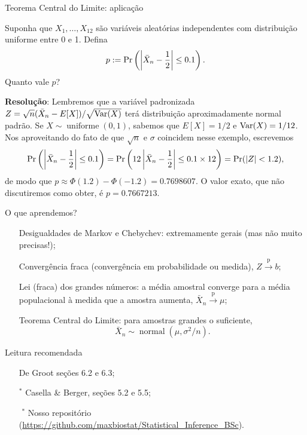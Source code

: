 \begin{frame}{Teorema Central do Limite: aplicação}
\begin{pergunta}
Suponha que $X_1, \ldots, X_{12}$ são variáveis aleatórias independentes com distribuição uniforme entre 0 e 1.
Defina
$$  p:=  \operatorname{Pr}\left(\left| \bar{X}_n - \frac{1}{2}\right| \leq 0.1\right).$$
Quanto vale $p$?
\end{pergunta}
\textbf{Resolução}: 
Lembremos que a variável padronizada $Z = \sqrt{n}(\bar{X}_n-E[X])/\sqrt{\operatorname{Var}(X)}$ terá distribuição aproximadamente normal padrão.
Se $X\sim \operatorname{uniforme}(0, 1)$, sabemos que $E[X] = 1/2$ e $\operatorname{Var}(X) = 1/12$.
Nos aproveitando do fato de que $\sqrt{n}$ e $\sigma$ coincidem nesse exemplo, escrevemos
$$\operatorname{Pr}\left(\left| \bar{X}_n - \frac{1}{2}\right| \leq 0.1\right) =  \operatorname{Pr}\left(12\left| \bar{X}_n - \frac{1}{2}\right| \leq 0.1\times 12\right) = \operatorname{Pr}(|Z| < 1.2),$$
de modo que $p \approx \Phi(1.2)-\Phi(-1.2) = 0.7698607$.
O valor exato, que não discutiremos como obter, é $p = 0.7667213$.
\end{frame}
\begin{frame}{O que aprendemos?}
\begin{itemize}
\item[\faLightbulbO] Desigualdades de Markov e Chebychev: extremamente gerais (mas não muito precisas!);
\item[\faLightbulbO] Convergência fraca (convergência em probabilidade ou medida), $Z \xrightarrow{\text{p}} b$;
\item[\faLightbulbO] Lei (fraca) dos grandes números: a média amostral converge para a média populacional à medida que a amostra aumenta, $\bar{X}_n \xrightarrow{\text{p}} \mu$;
\item[\faLightbulbO] Teorema Central do Limite: para amostras grandes o suficiente, 
$$\bar{X}_n \sim \operatorname{normal}(\mu, \sigma^2/n).$$
\end{itemize} 
\end{frame}
\begin{frame}{Leitura recomendada}
\begin{itemize}
 \item[\faBook] De Groot seções 6.2 e 6.3;
 \item[\faBook] $^\ast$ Casella \& Berger, seções 5.2 e 5.5;
 \item[\faGithub] $^\ast$ Nosso repositório (\url{https://github.com/maxbiostat/Statistical_Inference_BSc}).
\end{itemize} 
\end{frame}

